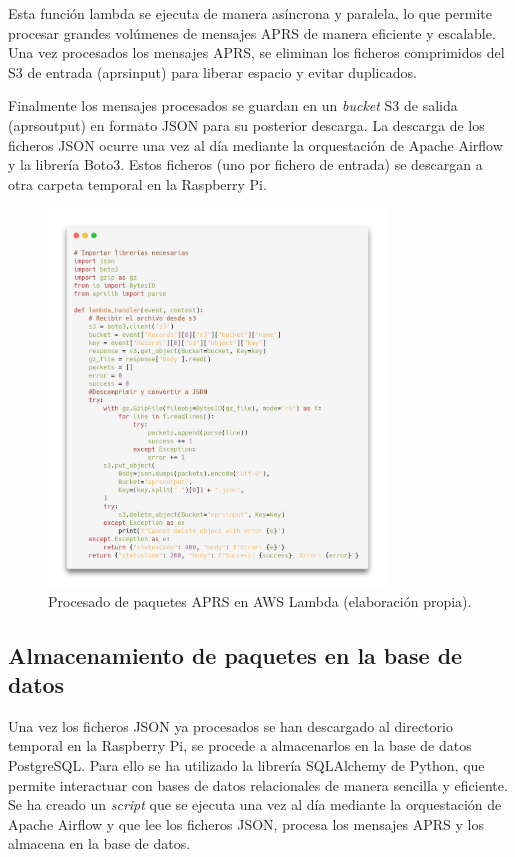 \noindent Esta función lambda se ejecuta de manera asíncrona y paralela, lo que permite procesar grandes volúmenes de mensajes APRS de manera eficiente y escalable. Una vez procesados los mensajes APRS, se eliminan los ficheros comprimidos del S3 de entrada (aprsinput) para liberar espacio y evitar duplicados.

Finalmente los mensajes procesados se guardan en un \textit{bucket} S3 de salida (aprsoutput) en formato JSON para su posterior descarga. La descarga de los ficheros JSON ocurre una vez al día mediante la orquestación de Apache Airflow y la librería Boto3. Estos ficheros (uno por fichero de entrada) se descargan a otra carpeta temporal en la Raspberry Pi.

\begin{figure}[h]
	\centering
	\includegraphics[width=0.8\textwidth]{Imagenes/Chapter_4/lambda.png}
	\caption[Procesado de paquetes APRS en AWS Lambda.]{Procesado de paquetes APRS en AWS Lambda (elaboración propia).}
	\label{fig:aws-lambda}
\end{figure}

\subsection{Almacenamiento de paquetes en la base de datos}

Una vez los ficheros JSON ya procesados se han descargado al directorio temporal en la Raspberry Pi, se procede a almacenarlos en la base de datos PostgreSQL. Para ello se ha utilizado la librería SQLAlchemy de Python, que permite interactuar con bases de datos relacionales de manera sencilla y eficiente. Se ha creado un \textit{script} que se ejecuta una vez al día mediante la orquestación de Apache Airflow y que lee los ficheros JSON, procesa los mensajes APRS y los almacena en la base de datos.

